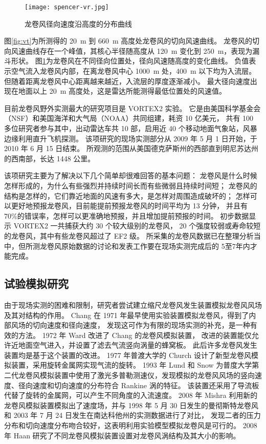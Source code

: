 \begin{figure}[!htbp]
    \centering
    \texttt{[image: spencer-vr.jpg]}
    \caption{龙卷风径向速度沿高度的分布曲线}
    \label{fig:vr}
\end{figure}

图\ref{fig:vt}为所测得的 \SI{20}{m} 到 \SI{660}{m} 高度处龙卷风的切向风速曲线。
龙卷风的切向风速曲线存在一个峰值，其核心半径随高度从 \SI{120}{m} 变化到 \SI{250}{m}，表现为漏斗形状。
图\ref{fig:vr}为龙卷风在不同径向位置处，径向风速随高度的变化曲线。
负值表示空气流入龙卷风内部，在离龙卷风中心 \SI{1000}{m} 处，\SI{400}{m} 以下均为入流层。
但随着距离龙卷风中心距离越来越近，入流层的厚度逐渐减小。
最大径向速度出现在地面以上 \SI{20}{m} 高度处，这是雷达所能测得最低位置处的风速值。

目前龙卷风野外实测最大的研究项目是 VORTEX2 实验。
它是由美国科学基金会（NSF）和美国海洋和大气局（NOAA）共同组建，耗资 10 亿美元，
共有 100 多位研究者参与其中，出动雷达车共 10 部，启用近 40 个移动地面气象站，风暴边缘利用直升飞机探测。
该项研究的现场实测部分从 2009 年 5 月 1 日开始，于 2010 年 6 月 15 日结束。
所观测的范围从美国德克萨斯州的西部直到明尼苏达州的西南部，长达 1448 公里。

该项研究主要为了解决以下几个简单却很难回答的基本问题：
龙卷风是什么时候怎样形成的，为什么有些强烈并持续时间长而有些微弱且持续时间短；
龙卷风的结构是怎样的，它们靠近地面的风速有多大，是怎样对周围造成破坏的；
怎样可以更好地预报龙卷风，目前能提前预报龙卷风的时间平均为 13 分钟，
并且有 $70\%$的错误率，怎样可以更准确地预报，并且增加提前预报的时间。
初步数据显示 VORTEX2 一共捕获大约 30 个较大级别的龙卷风，
20 个强度较弱或寿命较短的龙卷风，其中有些龙卷风超过了 EF2 级。
所采集的龙卷风数据已在整理分析当中，但所测龙卷风原始数据的讨论和发表工作要在现场实测完成后的 5至7年内才能完成。

\subsection{试验模拟研究}
由于现场实测的困难和限制，研究者尝试建立缩尺龙卷风发生装置模拟龙卷风风场及其对结构的作用。
Chang \cite{chang1971tornado}在 1971 年最早使用实验装置模拟龙卷风，得到了内部风场的切向速度和径向速度，
发现这可作为有限的现场实测的补充，是一种有效的方法。
1972 年 Ward \cite{ward1972exploration}改进了 Chang 的龙卷风模拟装置，
改进的装置能仅允许近地面空气进入，并设置了滤去气流竖向涡量的蜂窝板。
此后许多龙卷风发生装置均是基于这个装置的改进。
1977 年普渡大学的 Church \cite{church1977tornado}设计了新型龙卷风模拟装置，采用旋转金属网实现气流的旋转。
1993 年 Lund 和 Snow 为普度大学第二代龙卷风模拟装置中使用了激光多普勒测速仪，发现模拟的龙卷风风场的竖向速度、径向速度和切向速度的分布符合 Rankine 涡的特征。
该装置还采用了导流板代替了旋转的金属网，可以产生不同角度的入流速度。
2008 年 Mishra \cite{mishra2008physical}利用新的龙卷风模拟装置模拟出了速度场，并与 1998 年 5 月 30 日发生的曼彻斯特龙卷风和 2003 年 7 月 24 日发生在南达科他州的实测数据进行了对比，
发现二者的压力分布和切向速度分布吻合较好，这表明利用实验模型模拟龙卷风是可行的。
2008 年 Haan \cite{haan2009tornado}研究了不同龙卷风模拟装置设置对龙卷风涡结构及其大小的影响。

